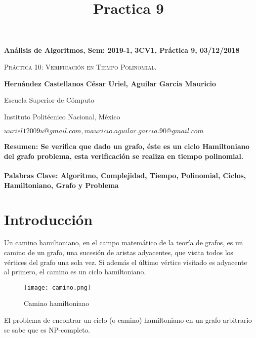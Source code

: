\documentclass[12pt,twoside]{article}
\title{Practica 9}
\date{}
\begin{document}
\centerline{\bf An\'alisis de Algoritmos, Sem: 2019-1, 3CV1, Pr\'actica 9, 03/12/2018}
\centerline{}
\centerline{}
\begin{center}
\Large{\textsc{Pr\'actica 10: Verificación en Tiempo Polinomial.}}
\end{center}
\centerline{}
\centerline{\bf {Hern\'andez Castellanos C\'esar Uriel, Aguilar Garcia Mauricio}}
\centerline{}
\centerline{Escuela Superior de C\'omputo}
\centerline{Instituto Polit\'ecnico Nacional, M\'exico}
\centerline{$uuriel12009u@gmail.com, mauricio.aguilar.garcia.90@gmail.com$}
\newtheorem{Theorem}{\quad Theorem}[section]
\newtheorem{Definition}[Theorem]{\quad Definition}
\newtheorem{Corollary}[Theorem]{\quad Corollary}
\newtheorem{Lemma}[Theorem]{\quad Lemma}
\newtheorem{Example}[Theorem]{\quad Example}
\bigskip
\textbf{Resumen: Se verifica que dado un grafo, éste es un ciclo Hamiltoniano del grafo problema, esta verificación se realiza en tiempo polinomial.} 
\\ 
\\
\textbf{Palabras Clave: Algoritmo, Complejidad, Tiempo, Polinomial, Ciclos, Hamiltoniano, Grafo y Problema}

\section{Introducción}
Un camino hamiltoniano, en el campo matemático de la teoría de grafos, es un camino de un grafo, una sucesión de aristas adyacentes, que visita todos los vértices del grafo una sola vez. Si además el último vértice visitado es adyacente al primero, el camino es un ciclo hamiltoniano.
\begin{figure}[H]
\centering
\texttt{[image: camino.png]}
\caption{Camino hamiltoniano}
\end{figure}
El problema de encontrar un ciclo (o camino) hamiltoniano en un grafo arbitrario se sabe que es NP-completo.
\end{document}
